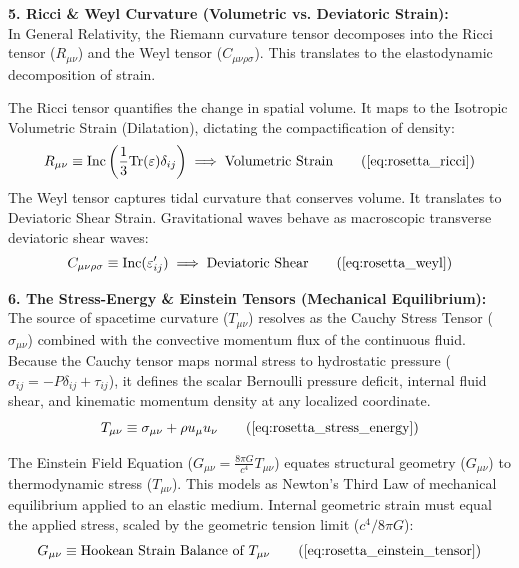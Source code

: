 \textbf{5. Ricci \& Weyl Curvature (Volumetric vs. Deviatoric Strain):} \\
In General Relativity, the Riemann curvature tensor decomposes into the Ricci tensor ($R_{\mu\nu}$) and the Weyl tensor ($C_{\mu\nu\rho\sigma}$). This translates to the elastodynamic decomposition of strain.

The Ricci tensor quantifies the change in spatial volume. It maps to the Isotropic Volumetric Strain (Dilatation), dictating the compactification of density: 
\begin{equation}
    R_{\mu\nu} \equiv \text{Inc}\left(\frac{1}{3}\text{Tr}(\varepsilon)\delta_{ij}\right) \implies \text{Volumetric Strain} \tag{\ref{eq:rosetta_ricci}}
\end{equation}
The Weyl tensor captures tidal curvature that conserves volume. It translates to Deviatoric Shear Strain. Gravitational waves behave as macroscopic transverse deviatoric shear waves: 
\begin{equation}
    C_{\mu\nu\rho\sigma} \equiv \text{Inc}(\varepsilon'_{ij}) \implies \text{Deviatoric Shear} \tag{\ref{eq:rosetta_weyl}}
\end{equation}

\textbf{6. The Stress-Energy \& Einstein Tensors (Mechanical Equilibrium):} \\
The source of spacetime curvature ($T_{\mu\nu}$) resolves as the Cauchy Stress Tensor ($\sigma_{\mu\nu}$) combined with the convective momentum flux of the continuous fluid. Because the Cauchy tensor maps normal stress to hydrostatic pressure ($\sigma_{ij} = -P \delta_{ij} + \tau_{ij}$), it defines the scalar Bernoulli pressure deficit, internal fluid shear, and kinematic momentum density at any localized coordinate.
\begin{equation}
    T_{\mu\nu} \equiv \sigma_{\mu\nu} + \rho u_\mu u_\nu \tag{\ref{eq:rosetta_stress_energy}}
\end{equation}

The Einstein Field Equation ($G_{\mu\nu} = \frac{8\pi G}{c^4} T_{\mu\nu}$) equates structural geometry ($G_{\mu\nu}$) to thermodynamic stress ($T_{\mu\nu}$). This models as Newton's Third Law of mechanical equilibrium applied to an elastic medium.  Internal geometric strain must equal the applied stress, scaled by the geometric tension limit ($c^4/8\pi G$):
\begin{equation}
    G_{\mu\nu} \equiv \text{Hookean Strain Balance of } T_{\mu\nu} \tag{\ref{eq:rosetta_einstein_tensor}}
\end{equation}

